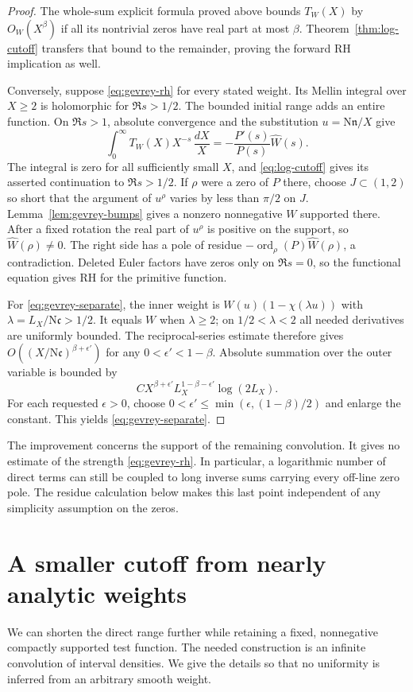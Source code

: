 \documentclass[11pt]{article}
\newcommand{\N}{\mathrm N}
\begin{document}
\begin{proof}
The whole-sum explicit formula proved above bounds $T_W(X)$ by
$O_W(X^\beta)$ if all its nontrivial zeros have real part at most
$\beta$. Theorem~\ref{thm:log-cutoff} transfers that bound to the
remainder, proving the forward RH implication as well.

Conversely, suppose \eqref{eq:gevrey-rh} for every stated weight.
Its Mellin integral over $X\ge2$ is holomorphic for $\Re s>1/2$.
The bounded initial range adds an entire function. On $\Re s>1$,
absolute convergence and the substitution $u=\N\mathfrak n/X$
give
\[
 \int_0^\infty T_W(X)X^{-s}\,\frac{dX}{X}
 =-\frac{P'(s)}{P(s)}\widehat W(s).
\]
The integral is zero for all sufficiently small $X$, and
\eqref{eq:log-cutoff} gives its asserted continuation to
$\Re s>1/2$. If $\rho$ were a zero of $P$ there, choose
$J\subset(1,2)$ so short that the argument of $u^\rho$ varies
by less than $\pi/2$ on $J$. Lemma~\ref{lem:gevrey-bumps}
gives a nonzero nonnegative $W$ supported there. After a fixed
rotation the real part of $u^\rho$ is positive on the support,
so $\widehat W(\rho)\ne0$. The right side has a pole of
residue $-\operatorname{ord}_\rho(P)\widehat W(\rho)$, a
contradiction. Deleted Euler factors have zeros only on
$\Re s=0$, so the functional equation gives RH for the primitive
function.

For \eqref{eq:gevrey-separate}, the inner weight is
$W(u)(1-\chi(\lambda u))$ with $\lambda=L_X/\N\mathfrak c>1/2$.
It equals $W$ when $\lambda\ge2$; on $1/2<\lambda<2$ all
needed derivatives are uniformly bounded. The reciprocal-series
estimate therefore gives $O((X/\N\mathfrak c)^{\beta+\epsilon'})$
for any $0<\epsilon'<1-\beta$. Absolute summation over the outer
variable is bounded by
\[
 C X^{\beta+\epsilon'}L_X^{1-\beta-\epsilon'}\log(2L_X).
\]
For each requested $\epsilon>0$, choose
$0<\epsilon'\le\min(\epsilon,(1-\beta)/2)$ and enlarge the
constant. This yields \eqref{eq:gevrey-separate}.
\end{proof}

The improvement concerns the support of the remaining convolution.
It gives no estimate of the strength \eqref{eq:gevrey-rh}.
In particular, a logarithmic number of direct terms can still be
coupled to long inverse sums carrying every off-line zero pole.
The residue calculation below makes this last point independent of any
simplicity assumption on the zeros.

\section{A smaller cutoff from nearly analytic weights}
\label{sec:near-analytic}
We can shorten the direct range further while retaining a fixed,
nonnegative compactly supported test function. The needed construction
is an infinite convolution of interval densities. We give the details
so that no uniformity is inferred from an arbitrary smooth weight.
\end{document}
